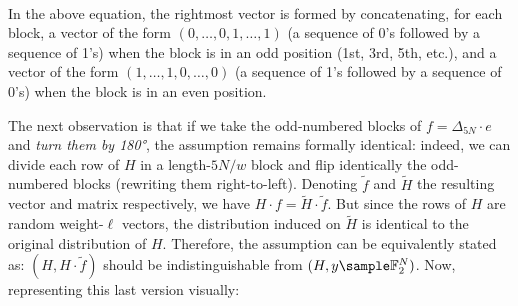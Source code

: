 \begin{minipage}{.53\textwidth}
\end{minipage}
~\\

In the above equation, the rightmost vector is formed by concatenating, for each block, a vector of the form $(0,\dots,0,1,\dots,1)$ (a sequence of 0’s followed by a sequence of 1’s) when the block is in an odd position (1st, 3rd, 5th, etc.), and a vector of the form $(1,\dots,1,0,\dots,0)$ (a sequence of 1’s followed by a sequence of 0’s) when the block is in an even position.

The next observation is that if we take the odd-numbered blocks of $f = \Delta_{5N}\cdot e$ and \emph{turn them by 180°}, the assumption remains formally identical: indeed, we can divide each row of $H$ in a length-$5N/w$ block and flip identically the odd-numbered blocks (rewriting them right-to-left). Denoting $\tilde f$ and $\tilde H$ the resulting vector and matrix respectively, we have $H\cdot f = \tilde H \cdot \tilde f$. But since the rows of $H$ are random weight-$\ell$ vectors, the distribution induced on $\tilde H$ is identical to the original distribution of $H$. Therefore, the assumption can be equivalently stated as: $(H, H\cdot \tilde f)$ should be indistinguishable from $(H,y\sample \F_2^N)$. Now, representing this last version visually:

